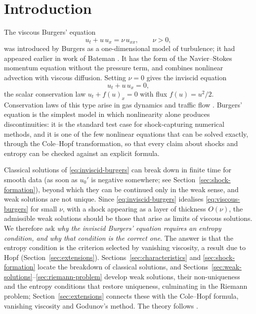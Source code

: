 
\section{Introduction}
\label{sec:motivation}

The viscous Burgers' equation
\begin{equation}
  \label{eq:viscous-burgers}
  u_t + u\,u_x = \nu\,u_{xx}, \qquad \nu>0,
\end{equation}
was introduced by Burgers \cite{burgers1948} as a one-dimensional model of
turbulence; it had appeared earlier in work of Bateman \cite{bateman1915}. It
has the form of the Navier--Stokes momentum equation without the pressure term,
and combines nonlinear advection with viscous diffusion. Setting $\nu=0$ gives
the inviscid equation
\begin{equation}
  \label{eq:inviscid-burgers}
  u_t + u\,u_x = 0,
\end{equation}
the scalar conservation law $u_t+f(u)_x=0$ with flux $f(u)=u^2/2$. Conservation
laws of this type arise in gas dynamics \cite{evans2010,leveque2002} and traffic flow \cite{lighthill1955}.
Burgers' equation is the simplest model in which nonlinearity alone produces
discontinuities: it is the standard test case for shock-capturing numerical
methods, and it is one of the few nonlinear equations that can be solved exactly,
through the Cole--Hopf transformation, so that every claim about shocks and entropy
can be checked against an explicit formula.

Classical solutions of \eqref{eq:inviscid-burgers} can break down in finite time
for smooth data (as soon as $u_0'$ is negative somewhere; see
Section~\ref{sec:shock-formation}), beyond which they can be continued only in
the weak sense, and weak solutions are not unique. Since
\eqref{eq:inviscid-burgers} idealises \eqref{eq:viscous-burgers} for small $\nu$,
with a shock appearing as a layer of thickness $O(\nu)$, the admissible weak
solutions should be those that arise as limits of viscous solutions. We
therefore ask \emph{why the inviscid Burgers' equation requires an entropy
condition, and why that condition is the correct one}. The answer is that the
entropy condition is the criterion selected by vanishing viscosity, a result due
to Hopf (Section~\ref{sec:extensions}). Sections~\ref{sec:characteristics} and
\ref{sec:shock-formation} locate the breakdown of classical solutions, and
Sections~\ref{sec:weak-solutions}--\ref{sec:riemann-problem} develop weak
solutions, their non-uniqueness and the entropy conditions that restore
uniqueness, culminating in the Riemann problem; Section~\ref{sec:extensions}
connects these with the Cole--Hopf formula, vanishing viscosity and Godunov's
method. The theory follows \cite[\S3.4]{evans2010}.

